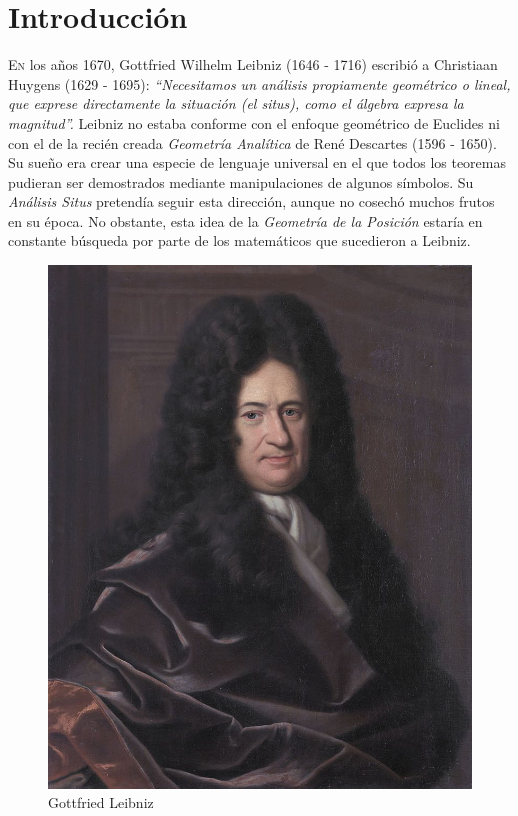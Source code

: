 \chapter*{Introducción}

    \lettrine[lines=9] {\initfamily  \selectfont E}{n} los años 1670, Gottfried Wilhelm Leibniz (1646 - 1716) escribió a Christiaan Huygens (1629 - 1695): \textit{``Necesitamos un análisis propiamente geométrico o lineal, que exprese directamente la situación (el situs), como el álgebra expresa la magnitud''.} Leibniz no estaba conforme con el enfoque geométrico de Euclides ni con el de la recién creada \textit{Geometría Analítica} de René Descartes (1596 - 1650). Su sueño era crear una especie de lenguaje universal en el que todos los teoremas pudieran ser demostrados mediante manipulaciones de algunos símbolos. Su \textit{Análisis Situs} pretendía seguir esta dirección, aunque no cosechó muchos frutos en su época. No obstante, esta idea de la \textit{Geometría de la Posición} estaría en constante búsqueda por parte de los matemáticos que sucedieron a Leibniz.
    
            \begin{figure}
            \vspace{-0.4cm}
            \centering
            \includegraphics[scale=0.5]{img/imgintro/Gottfried_Wilhelm_Leibniz,_Bernhard_Christoph_Francke.jpg}
            \caption{Gottfried Leibniz}
            \label{fig:euler} 
        \end{figure}



